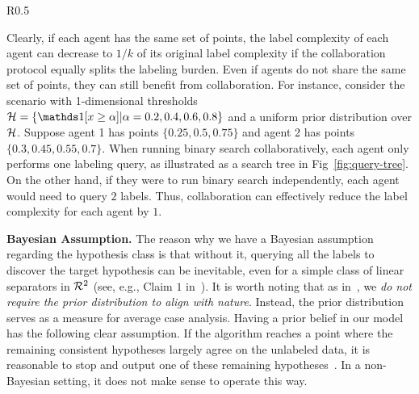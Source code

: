 \begin{wrapfigure}[12]{R}{0.5\textwidth}
    \begin{minipage}{0.5\textwidth}
    \centering
    \caption{The query tree of binary search for thresholds.}
    \label{fig:query-tree}
\end{minipage}
\end{wrapfigure}
Clearly, if each agent has the same set of points, the label complexity of each agent can decrease to $1/k$ of its original label complexity if the collaboration protocol equally splits the labeling burden.
    Even if agents do not share the same set of points, they can still benefit from collaboration. For instance, consider the scenario with 1-dimensional thresholds $\cH =\{\ind{x\geq \alpha}|\alpha = 0.2,0.4,0.6,0.8\}$ and a uniform prior distribution over $\mathcal{H}$. 
    Suppose agent 1 has points $\{0.25,0.5,0.75\}$ and agent 2 has points $\{0.3,0.45, 0.55, 0.7\}$. 
    When running binary search collaboratively, each agent only performs one labeling query, as illustrated as a search tree in Fig~\ref{fig:query-tree}. On the other hand, if they were to run binary search independently, each agent would need to query $2$ labels. Thus, collaboration can effectively reduce the label complexity for each agent by $1$.

 \textbf{Bayesian Assumption.} 
 The reason why we have a Bayesian assumption regarding the hypothesis class is that without it, querying all the labels to discover the target hypothesis can be inevitable, even for a simple class of linear separators in $\mathcal{R}^2$ (see, e.g., Claim $1$ in~\citep{dasgupta2004analysis}).
It is worth noting that as in~\citep{dasgupta2004analysis}, we \textit{do not require the prior distribution to align with nature}. Instead, the prior distribution serves as a measure for average case analysis. Having a prior belief in our model has the following clear assumption. If the algorithm reaches a point where the remaining consistent hypotheses largely agree 
on the unlabeled data, it is reasonable to stop and output one of these remaining hypotheses~\citep{FreundSST97}. In a non-Bayesian setting, it does not make sense to operate this way. 

